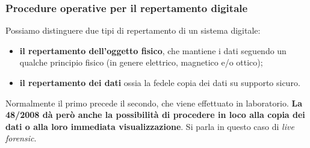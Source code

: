 \documentclass[11pt]{beamer}
\begin{document}
	\begin{frame}
		\frametitle{Procedure operative per il repertamento digitale}
		Possiamo distinguere due tipi di repertamento di un sistema digitale:
		
		\begin{itemize}
			\item \textbf{il repertamento dell'oggetto fisico}, che mantiene i dati seguendo un qualche principio fisico (in genere elettrico, magnetico e/o ottico);
			\item \textbf{il repertamento dei dati} ossia la fedele copia dei dati su supporto sicuro.
		\end{itemize}
		\vfill
		Normalmente il primo precede il secondo, che viene effettuato in laboratorio. \textbf{La 48/2008 dà però anche la possibilità di procedere in loco alla copia dei dati o alla loro immediata visualizzazione}. Si parla in questo caso di \textit{live forensic}.
		
	\end{frame}
	
\end{document}
